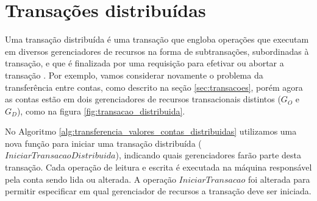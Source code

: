 \documentclass[11pt,twoside,a4paper]{book}
\begin{document}

\section{Transações distribuídas}
\label{sec:transacoes_distribuidas}

Uma transação distribuída é uma transação que engloba operações que executam em diversos gerenciadores de recursos na forma de subtransações, subordinadas à transação, e que é finalizada por uma requisição para efetivar ou abortar a transação \cite{gray-lamport}. Por exemplo, vamos considerar novamente o problema da transferência entre contas, como descrito na seção \ref{sec:transacoes}, porém agora as contas estão em dois gerenciadores de recursos transacionais distintos ($G_O$ e $G_D$), como na figura \ref{fig:transacao_distribuida}. 


No Algoritmo \ref{alg:transferencia_valores_contas_distribuidas} utilizamos uma nova função para iniciar uma transação distribuída ($IniciarTransacaoDistribuida$), indicando quais gerenciadores farão parte desta transação. Cada operação de leitura e escrita é executada na máquina responsável pela conta sendo lida ou alterada. A operação $IniciarTransacao$ foi alterada para permitir especificar em qual gerenciador de recursos a transação deve ser iniciada.
\end{document}
